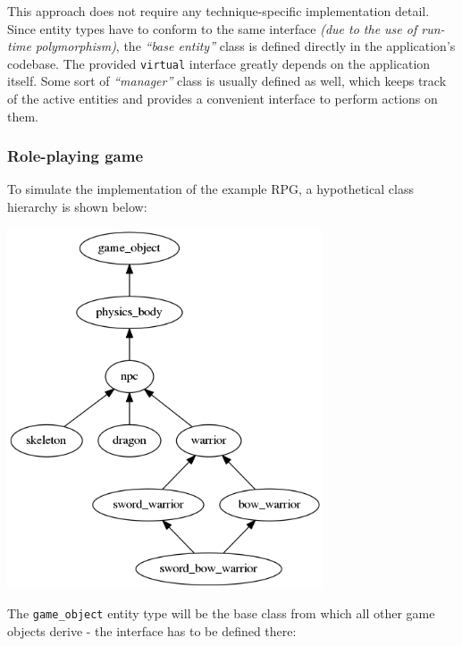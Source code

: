 \documentclass[twoside, 12pt, a4paper, openany]{book}
\let\origfigure=\figure
\let\endorigfigure=\endfigure
\renewenvironment{figure}[1][]{%
\origfigure[H]
}{%
\endorigfigure
}
\begin{document}
This approach does not require any technique-specific implementation
detail. Since entity types have to conform to the same interface
\emph{(due to the use of run-time polymorphism)}, the \emph{``base
entity''} class is defined directly in the application's codebase. The
provided
\texttt{virtual}
interface greatly depends on the application itself. Some sort of
\emph{``manager''} class is usually defined as well, which keeps track
of the active entities and provides a convenient interface to perform
actions on them.

\subsubsection{Role-playing game}\label{role-playing-game-1}

To simulate the implementation of the example RPG, a hypothetical class
hierarchy is shown below:

\begin{figure}[htbp]
\centering
\includegraphics[width=0.70000\textwidth]{source/figures/generated/ecs/overview/oop/example_hierarchy_rpg.png}
\caption{Object-oriented inheritance: RPG entity hierarchy}
\end{figure}

The
\texttt{game_object}
entity type will be the base class from which all other game objects
derive - the interface has to be defined there:
\end{document}
